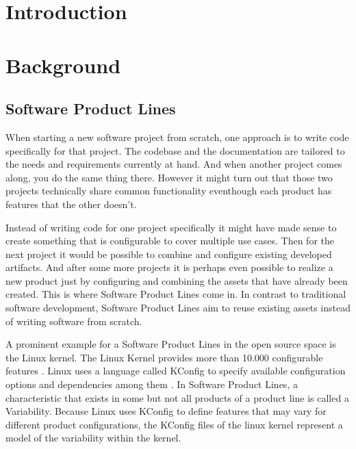 \documentclass[a4paper]{article}
\begin{document}
\newpage
\lhead{{}}
\rhead{\leftmark}
\pagestyle{fancy}

\listoftodos[Notes]
\clearpage

\tableofcontents
\newpage


\maketitle
\newpage

\setcounter{page}{1}
\lhead{{}}
\rhead{\leftmark}
\pagestyle{fancy}



\section{Introduction}



\section{Background}
\subsection{Software Product Lines}

When starting a new software project from scratch, one approach is to write code specifically for that project. The codebase and the documentation are tailored to the needs and requirements currently at hand. And when another project comes along, you do the same thing there. However it might turn out that those two projects technically share common functionality eventhough each product has features that the other doesn't.

Instead of writing code for one project specifically it might have made sense to create something that is configurable to cover multiple use cases. Then for the next project it would be possible to combine and configure existing developed artifacts. And after some more projects it is perhaps even possible to realize a new product just by configuring and combining the assets that have already been created. This is where Software Product Lines come in. In contrast to traditional software development, Software Product Lines aim to reuse existing assets instead of writing software from scratch.

A prominent example for a Software Product Lines in the open source space is the Linux kernel. The Linux Kernel provides more than 10.000 configurable features \cite{Tartler:2011:FCC:1966445.1966451}. Linux uses a language called KConfig to specify available configuration options and dependencies among them \cite{variabilitymodel-linux}. In Software Product Lines, a characteristic that exists in some but not all products of a product line is called a Variability. Because Linux uses KConfig to define features that may vary for different product configurations, the KConfig files of the linux kernel represent a model of the variability within the kernel.
\end{document}
